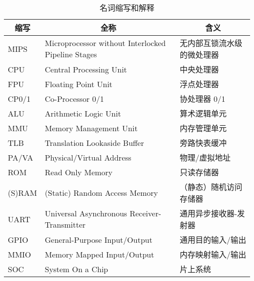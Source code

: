 \begin{table}[!htbp]
    \centering
    \begin{tabular}{|l|l|l|}
    \hline
    \multicolumn{1}{|c|}{\textbf{缩写}} & \multicolumn{1}{c|}{\textbf{全称}}                   & \multicolumn{1}{c|}{\textbf{含义}} \\ \hline
    MIPS                              & Microprocessor without Interlocked Pipeline Stages & 无内部互锁流水级的微处理器                    \\ \hline
    CPU                               & Central Processing Unit                            & 中央处理器                            \\ \hline
    FPU                               & Floating Point Unit                                & 浮点处理器                            \\ \hline
    CP0/1                             & Co-Processor 0/1                                   & 协处理器 0/1                         \\ \hline
    ALU                               & Arithmetic Logic Unit                              & 算术逻辑单元                           \\ \hline
    MMU                               & Memory Management Unit                             & 内存管理单元                           \\ \hline
    TLB                               & Translation Lookaside Buffer                       & 旁路快表缓冲                           \\ \hline
    PA/VA                             & Physical/Virtual Address                           & 物理/虚拟地址                          \\ \hline
    ROM                               & Read Only Memory                                   & 只读存储器                            \\ \hline
    (S)RAM                            & (Static) Random Access Memory                      & （静态）随机访问存储器                      \\ \hline
    UART                              & Universal Asynchronous Receiver-Transmitter        & 通用异步接收器-发射器                      \\ \hline
    GPIO                              & General-Purpose Input/Output                       & 通用目的输入/输出                        \\ \hline
    MMIO                              & Memory Mapped Input/Output                         & 内存映射输入/输出                        \\ \hline
    SOC                               & System On a Chip                                   & 片上系统                             \\ \hline
    \end{tabular}

    \caption{名词缩写和解释}
    \label{table:abbreviation_definition}

\end{table}

